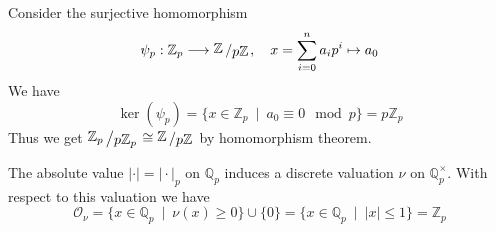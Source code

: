 \documentclass[12pt]{book}
\newcommand{\slant}[2]{{\raisebox{.1em}{$#1$}\left/\raisebox{-.1em}{$#2$}\right.}}
\begin{document}
\begin{spacing}{1.3}
\begin{compactenum}
\item Consider the surjective homomorphism
$$\psi_p: \mathbb{Z}_p \longrightarrow \slant{\mathbb{Z}}{p \mathbb{Z}}, \quad x=\sum_{i=0}^n a_ip^{i} \mapsto a_0$$
We have
$$\ker(\psi_p)=\{x \in \mathbb{Z}_p  \ \mid \ a_0 \equiv 0 \mod p\}=p\mathbb{Z}_p$$
Thus we get
$\slant{\mathbb{Z}_p}{p\mathbb{Z}_p} \cong \slant{\mathbb{Z}}{p\mathbb{Z}}$ by homomorphism theorem.
\item The absolute value $\vert \cdot \vert=\vert \cdot \vert_p$ on $\mathbb{Q}_p$ induces a discrete valuation $\nu$ on $\mathbb{Q}_p^{\times}$. With respect to this valuation we have
$$\mathcal{O}_{\nu}=\{x \in \mathbb{Q}_p \ \mid \ \nu(x) \geqslant 0\} \cup \{0\} = \{x \in \mathbb{Q}_p \ \mid \ |x|\leqslant 1 \} = \mathbb{Z}_p$$
\end{compactenum}


\end{spacing}
\end{document}
